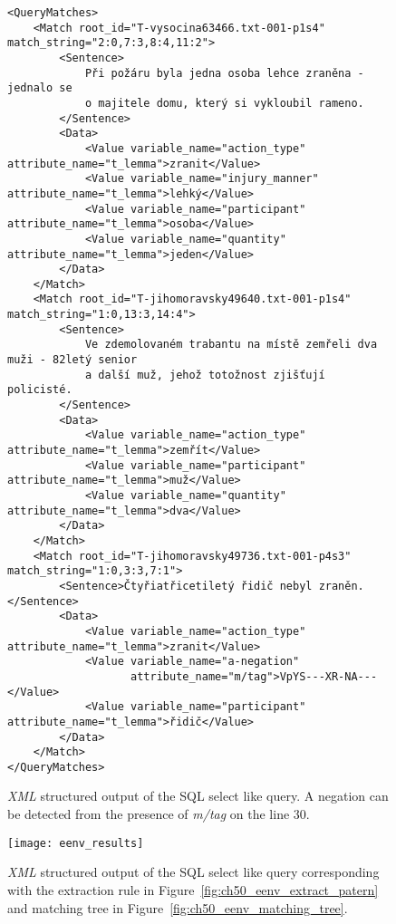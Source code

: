 \begin{figure}
\begin{verbatim}
<QueryMatches>
	<Match root_id="T-vysocina63466.txt-001-p1s4" match_string="2:0,7:3,8:4,11:2">
		<Sentence>
			Při požáru byla jedna osoba lehce zraněna - jednalo se
			o majitele domu, který si vykloubil rameno.
		</Sentence>
		<Data>
			<Value variable_name="action_type" attribute_name="t_lemma">zranit</Value>
			<Value variable_name="injury_manner" attribute_name="t_lemma">lehký</Value>
			<Value variable_name="participant" attribute_name="t_lemma">osoba</Value>
			<Value variable_name="quantity" attribute_name="t_lemma">jeden</Value>
		</Data>
	</Match>
	<Match root_id="T-jihomoravsky49640.txt-001-p1s4" match_string="1:0,13:3,14:4">
		<Sentence>
			Ve zdemolovaném trabantu na místě zemřeli dva muži - 82letý senior
			a další muž, jehož totožnost zjišťují policisté.
		</Sentence>
		<Data>
			<Value variable_name="action_type" attribute_name="t_lemma">zemřít</Value>
			<Value variable_name="participant" attribute_name="t_lemma">muž</Value>
			<Value variable_name="quantity" attribute_name="t_lemma">dva</Value>
		</Data>
	</Match>
	<Match root_id="T-jihomoravsky49736.txt-001-p4s3" match_string="1:0,3:3,7:1">
		<Sentence>Čtyřiatřicetiletý řidič nebyl zraněn.</Sentence>
		<Data>
			<Value variable_name="action_type" attribute_name="t_lemma">zranit</Value>
			<Value variable_name="a-negation" 
			       attribute_name="m/tag">VpYS---XR-NA---</Value>
			<Value variable_name="participant" attribute_name="t_lemma">řidič</Value>
		</Data>
	</Match>
</QueryMatches>
\end{verbatim}
\caption{\emph{XML} structured output of the SQL select like query. A negation can be detected from the presence of \emph{m/tag} on the line 30.}
\label{fig:select_xml}
\end{figure}

\begin{figure}
	\centering
		\texttt{[image: eenv\_results]}
	\caption{\emph{XML} structured output of the SQL select like query corresponding with the extraction rule in Figure~\ref{fig:ch50_eenv_extract_patern} and matching tree in Figure~\ref{fig:ch50_eenv_matching_tree}.}
	\label{fig:ch50_eenv_results}
\end{figure}























